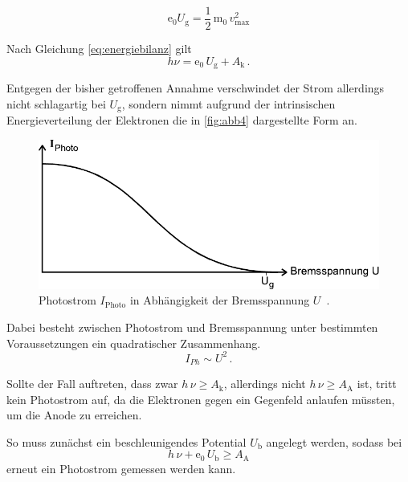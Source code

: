 \begin{equation*}
    \text{e}_0 U_\text{g} = \dfrac{1}{2} \, \text{m}_0 \, v^2_\text{max}
\end{equation*}


Nach Gleichung \eqref{eq:energiebilanz} gilt
\begin{equation*}
    h \nu = \text{e}_0 \,U_\text{g} + A_\text{k} \,.
\end{equation*}

Entgegen der bisher getroffenen Annahme verschwindet der Strom allerdings nicht schlagartig bei $U_\text{g}$, sondern nimmt aufgrund der intrinsischen Energieverteilung der Elektronen die in \autoref{fig:abb4}
dargestellte Form an.

\begin{figure}[H]
    \centering
    \includegraphics{figures/Abb4.pdf}
    \caption{Photostrom $I_\text{Photo}$ in Abhängigkeit der Bremsspannung $U$ \,\cite{ap10}.}
    \label{fig:abb4}
\end{figure}

Dabei besteht zwischen Photostrom und Bremsspannung unter bestimmten Voraussetzungen ein quadratischer Zusammenhang.
\begin{equation*}
    I_{Ph} \sim U^2 \,.
\end{equation*}

Sollte der Fall auftreten, dass zwar $h \, \nu \geq A_\text{k}$, allerdings nicht $h \, \nu \geq A_\text{A}$ ist, tritt kein Photostrom auf, da die Elektronen gegen ein Gegenfeld anlaufen müssten,
um die Anode zu erreichen.


So muss zunächst ein beschleunigendes Potential $U_\text{b}$ angelegt werden, sodass bei
\begin{equation*}
    h \, \nu + \text{e}_0 \, U_\text{b} \geq A_\text{A}
\end{equation*}
erneut ein Photostrom gemessen werden kann.

